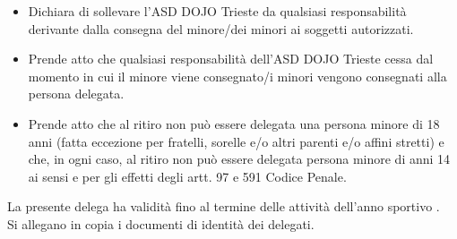\documentclass{djtsmod}
\begin{document}
	\begin{itemize}
		\item Dichiara di sollevare l'ASD DOJO Trieste da qualsiasi responsabilità derivante dalla consegna del minore/dei minori ai soggetti autorizzati.
		\item Prende atto che qualsiasi responsabilità dell'ASD DOJO Trieste cessa dal momento in cui il minore viene consegnato/i minori vengono consegnati alla persona delegata.
		\item Prende atto che al ritiro non può essere delegata una persona minore di 18 anni (fatta eccezione per fratelli, sorelle e/o altri parenti e/o affini stretti) e che, in ogni caso, al ritiro non può essere delegata persona minore di anni 14 ai sensi e per gli effetti degli artt. 97 e 591 Codice Penale.
	\end{itemize}
	La presente delega ha validità fino al termine delle attività dell'anno sportivo \field{1.5in}. \\[5px]
	Si allegano in copia i documenti di identità dei delegati.
	
	\vspace{0.1in}
\end{document}
